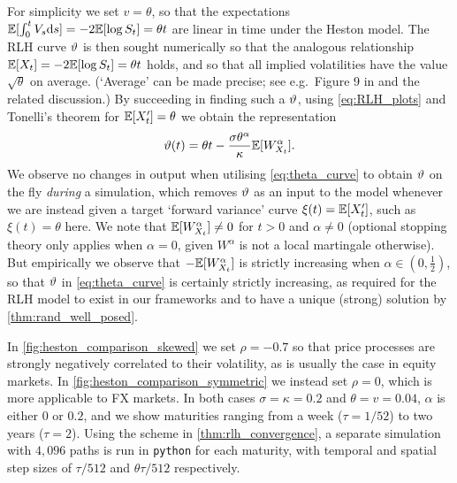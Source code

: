 For simplicity we set $v=\theta$, so that the expectations $\mathbb{E}[\int_0^t V_s \mathrm{d} s]=-2\mathbb{E}[\log S_t] = \theta t$ are linear in time under the Heston model. The RLH curve $\vartheta$ is then sought numerically so that the analogous relationship $\mathbb{E}[X_t]=-2\mathbb{E}[\log S_t] = \theta t$ holds, and so that all implied volatilities have the value $\sqrt{\theta}$ on average. (`Average' can be made precise; see e.g.~Figure 9 in \cite{mccrickerd_2018} and the related discussion.) By succeeding in finding such a $\vartheta$, using \autoref{eq:RLH_plots} and Tonelli's theorem for $\mathbb{E}[X'_t]=\theta$ we obtain the representation
\begin{equation}\label{eq:theta_curve}
    \vartheta(t) = \theta t - \frac{\sigma \theta^\alpha}{\kappa}\mathbb{E}[W^\alpha_{X_t}].
\end{equation}
We observe no changes in output when utilising \autoref{eq:theta_curve} to obtain $\vartheta$ on the fly \emph{during} a simulation, which removes $\vartheta$ as an input to the model whenever we are instead given a target `forward variance' curve $\xi(t)=\mathbb{E}[X'_t]$, such as $\xi(t)=\theta$ here. We note that $\mathbb{E}[W^\alpha_{X_t}]\neq 0$ for $t>0$ and $\alpha\neq0$ (optional stopping theory only applies when $\alpha=0$, given $W^\alpha$ is not a local martingale otherwise). But empirically we observe that $-\mathbb{E}[W^\alpha_{X_t}]$ is strictly increasing when $\alpha\in(0,\frac12)$, so that $\vartheta$ in \autoref{eq:theta_curve} is certainly strictly increasing, as required for the RLH model to exist in our frameworks and to have a unique (strong) solution by \autoref{thm:rand_well_posed}.

In \autoref{fig:heston_comparison_skewed} we set $\rho=-0.7$ so that price processes are strongly negatively correlated to their volatility, as is usually the case in equity markets. In \autoref{fig:heston_comparison_symmetric} we instead set $\rho=0$, which is more applicable to FX markets. In both cases $\sigma=\kappa=0.2$ and  $\theta=v=0.04$, $\alpha$ is either 0 or $0.2$, and we show maturities ranging from a week ($\tau=1/52$) to two years ($\tau=2$). Using the scheme in \autoref{thm:rlh_convergence}, a separate simulation with $4,096$ paths is run in \texttt{python} for each maturity, with temporal and spatial step sizes of $\tau/512$ and $\theta\tau/512$ respectively.

